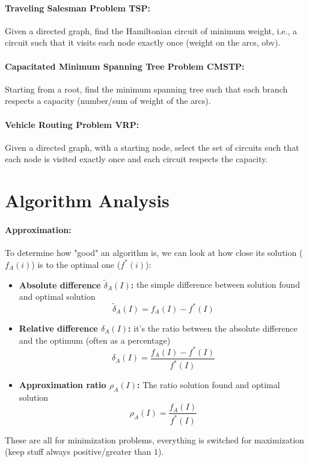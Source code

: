 \documentclass{article}
\begin{document}
	\paragraph{Traveling Salesman Problem TSP:} Given a directed graph, find the Hamiltonian circuit of minimum weight, i.e., a circuit such that it visits each node exactly once (weight on the arcs, obv).\\
	
	\paragraph{Capacitated Minimum Spanning Tree Problem CMSTP:} Starting from a root, find the minimum spanning tree such that each branch respects a capacity (number/sum of weight of the arcs).\\
	
	\paragraph{Vehicle Routing Problem VRP:} Given a directed graph, with a starting node, select the set of circuits such that each node is visited exactly once and each circuit respects the capacity.\\
	
	
	\section*{Algorithm Analysis}
	
	\paragraph{Approximation:} To determine how "good" an algorithm is, we can look at how close its solution ($f_A (i)$) is to the optimal one ($f^\ast (i)$): 
	\begin{itemize}
		\item \textbf{Absolute difference $\tilde \delta_A(I)$:} the simple difference between solution found and optimal solution
		$$ \tilde{\delta}_A (I) = f_A (I) - f^\ast (I) $$
		\item \textbf{Relative difference $\delta_A (I)$:} it's the ratio between the absolute difference and the optimum (often as a percentage)
		$$ \delta_A(I) = \frac{f_A (I) - f^\ast (I)}{f^\ast (I)} $$
		\item \textbf{Approximation ratio $\rho_A (I)$:} The ratio solution found and optimal solution
		$$ \rho_A (I) = \frac{f_A (I)}{f^\ast (I)} $$
	\end{itemize}
	These are all for minimization problems, everything is switched for maximization (keep stuff always positive/greater than $1$).\\
	
\end{document}
